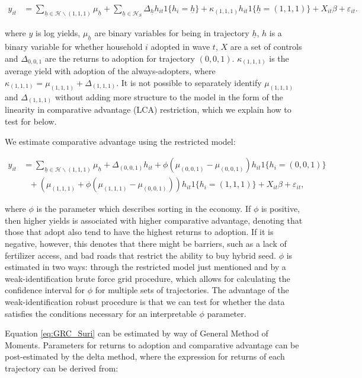 \documentclass{article}
\begin{document}
\begin{align}
y_{it}&=\sum_{\underline{h}\in\mathcal{H}\backslash (1,1,1)}\mu_{\underline{h}}+\sum_{\underline{h}\in\mathcal{H}_{S}}\Delta_{\underline{h}}h_{it}1\{h_{i}=\underline{h}\} + \kappa_{(1,1,1)}h_{it}1\{\underline{h}=(1,1,1)\}+ X_{it}\beta+\varepsilon_{it}.\label{eq:GRC}
\end{align}

where $y$ is log yields, $\mu_{\underline{h}}$ are binary variables for being in trajectory $\underline{h}$, $h$ is a binary variable for whether household $i$ adopted in wave $t$, $X$ are a set of controls and $\Delta_{0,0,1}$ are the returns to adoption for trajectory $(0,0,1)$. $\kappa_{(1,1,1)}$ is the average yield with adoption of the always-adopters, where $\kappa_{(1,1,1)} = \mu_{(1,1,1)} + \Delta_{(1,1,1)}$. It is not possible to separately identify $\mu_{(1,1,1)}$ and $\Delta_{(1,1,1)}$ without adding more structure to the model in the form of the linearity in comparative advantage (LCA) restriction, which we explain how to test for below.


We estimate comparative advantage using the restricted model:

\begin{align}
y_{it}&=\sum_{\underline{h}\in\mathcal{H}\backslash (1,1,1)}\mu_{\underline{h}}+\Delta_{(0,0,1)}h_{it}+\phi(\mu_{(0,0,1)}-\mu_{(0,0,1)})h_{it}1\{h_{i}=(0,0,1)\}\nonumber\\
&~~~+\left(\mu_{(1,1,1)}+\phi\left(\mu_{(1,1,1)}-\mu_{(0,0,1)}\right)\right)h_{it}1\{h_{i}=(1,1,1)\} + X_{it}\beta +\varepsilon_{it},\label{eq:GRC_Suri}
\end{align}

where $\phi$ is the parameter which describes sorting in the economy. If $\phi$ is positive, then higher yields is associated with higher comparative advantage, denoting that those that adopt also tend to have the highest returns to adoption. If it is negative, however, this denotes that there might be barriers, such as a lack of fertilizer access, and bad roads that restrict the ability to buy hybrid seed. $\phi$ is estimated in two ways: through the restricted model just mentioned and by a weak-identification brute force grid procedure, which allows for calculating the confidence interval for $\phi$ for multiple sets of trajectories. The advantage of the weak-identification robust procedure is that we can test for whether the data satisfies the conditions necessary for an interpretable $\phi$ parameter.

Equation \ref{eq:GRC_Suri} can be estimated by way of General Method of Moments. Parameters for returns to adoption and comparative advantage can be post-estimated by the delta method, where the expression for returns of each trajectory can be derived from:
\end{document}

